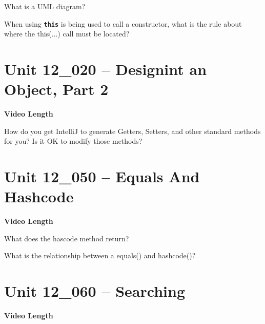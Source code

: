 \documentclass[letterpaper,12pt]{exam}
\newcommand{\unit}{Unit 12}
\begin{document}
\begin{questions}
\begin{samepage}
    \question What is a UML diagram?
    \vspace{5mm}
\end{samepage}

\begin{samepage}
    \question When using \texttt{\textbf{this}} is being used to call a constructor, what is the rule about where the this(...) call must be located?
    \vspace{5mm}
\end{samepage}

\section*{\unit\_020 -- Designint an Object, Part 2} 
\par{\selectfont\textbf{Video Length }}

\begin{samepage}
    \question How do you get IntelliJ to generate Getters, Setters, and other standard methods for you?  Is it OK to modify those methods?
    \vspace{5mm}
\end{samepage}

\section*{\unit\_050 -- Equals And Hashcode} 
\par{\selectfont\textbf{Video Length }}

\begin{samepage}
    \question What does the hascode method return?
    \vspace{5mm}
\end{samepage}

\begin{samepage}
    \question What is the relationship between a equals() and hashcode()?
    \vspace{5mm}
\end{samepage}


\section*{\unit\_060 -- Searching} 
\par{\selectfont\textbf{Video Length }}


\end{questions}
\end{document}
